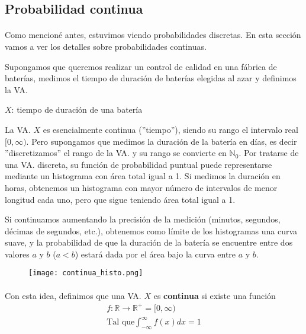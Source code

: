\documentclass[../main.tex]{subfiles}
\begin{document}
\subsection{Probabilidad continua}
\label{seq:proba:continua}

\paragraph{} Como mencioné antes, estuvimos viendo probabilidades discretas. En esta sección vamos a ver los detalles sobre probabilidades continuas.

Supongamos que queremos realizar un control de calidad en una fábrica de baterías, medimos el tiempo de duración de baterías elegidas al azar y definimos la VA.
\begin{center}
  \(X\): tiempo de duración de una batería
\end{center}

La VA. \(X\) es esencialmente continua (''tiempo''), siendo su rango el intervalo real \([0, \infty)\). Pero supongamos que medimos la duración de la batería en días, es decir ''discretizamos'' el rango de la VA. y su rango se convierte en \(\mathbb{N}_{0}\). Por tratarse de una VA. discreta, su función de probabilidad puntual puede representarse mediante un histograma con área total igual a 1. Si medimos la duración en horas, obtenemos un histograma con mayor número de intervalos de menor longitud cada uno, pero que sigue teniendo área total igual a 1.

Si continuamos aumentando la precisión de la medición (minutos, segundos, décimas de segundos, etc.), obtenemos como límite de los histogramas una curva suave, y la probabilidad de que la duración de la batería se encuentre entre dos valores \(a\) y \(b\) (\(a < b\)) estará dada por el área bajo la curva entre \(a\) y \(b\).

\begin{figure}[H]
  \centering
  \texttt{[image: continua\_histo.png]} %
\end{figure}

\paragraph{} Con esta idea, definimos que una VA. \(X\) es \textbf{continua} si existe una función
\begin{gather*}
  f : \mathbb{R} \rightarrow \mathbb{R}^{+} = [0, \infty) \\
  \text{Tal que} \int_{-\infty}^{\infty}f(x)dx = 1
\end{gather*}
\end{document}
